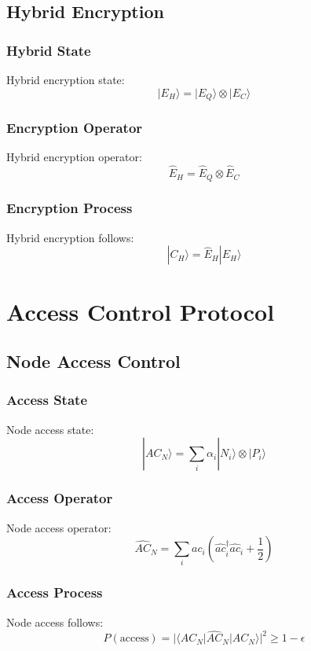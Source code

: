 \documentclass[12pt]{article}
\begin{document}
\subsection{Hybrid Encryption}
\subsubsection{Hybrid State}
Hybrid encryption state:
\begin{equation}
|E_H\rangle = |E_Q\rangle \otimes |E_C\rangle
\end{equation}
\subsubsection{Encryption Operator}
Hybrid encryption operator:
\begin{equation}
\hat{E}_H = \hat{E}_Q \otimes \hat{E}_C
\end{equation}
\subsubsection{Encryption Process}
Hybrid encryption follows:
\begin{equation}
|C_H\rangle = \hat{E}_H|E_H\rangle
\end{equation}
\section{Access Control Protocol}
\subsection{Node Access Control}
\subsubsection{Access State}
Node access state:
\begin{equation}
|AC_N\rangle = \sum_i \alpha_i|N_i\rangle \otimes |P_i\rangle
\end{equation}
\subsubsection{Access Operator}
Node access operator:
\begin{equation}
\hat{AC}_N = \sum_i ac_i(\hat{ac}_i^\dagger\hat{ac}_i + \frac{1}{2})
\end{equation}
\subsubsection{Access Process}
Node access follows:
\begin{equation}
P(\text{access}) = |\langle AC_N|\hat{AC}_N|AC_N\rangle|^2 \geq 1 - \epsilon
\end{equation}
\end{document}
